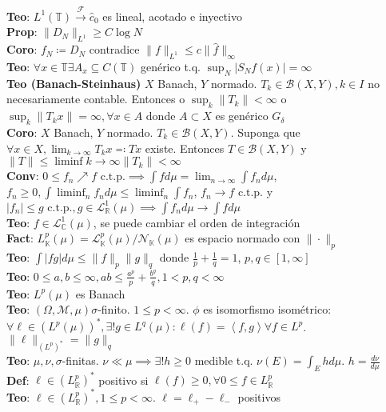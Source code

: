 \documentclass[9pt]{extarticle}
\newcommand{\C}{\mathbb{C}}
\newcommand{\R}{\mathbb{R}}
\newcommand{\K}{\mathbb{K}}
\newcommand{\T}{\mathbb{T}}
\newcommand{\F}{\mathcal{F}}
\newcommand{\inn}[1]{\left\langle #1\right\rangle}
\begin{document}
\begin{multicols*}{2}
\textbf{Teo}: $L^1(\T)\xrightarrow{\F}\hat c_0$ es lineal, acotado e inyectivo\\
\textbf{Prop}: $\|D_N\|_{L^1}\geq C\log N$\\
\textbf{Coro}: $f_N\coloneqq D_N$ contradice $\|f\|_{L^1}\leq c\|\hat f\|_{\infty}$\\
\textbf{Teo}: $\forall x\in\T\exists A_x\subseteq C(\T)$ genérico t.q. $\sup_N|S_N f(x)|=\infty$\\
\textbf{Teo (Banach-Steinhaus)} $X$ Banach, $Y$ normado. $T_k\in\mathcal{B}(X,Y),k\in I$ no necesariamente contable. Entonces o $\sup_{k}\|T_k\|<\infty$ o $\sup_k\|T_kx\|=\infty,\forall x\in A$ donde $A\subset X$ es genérico $G_\delta$\\
\textbf{Coro}: $X$ Banach, $Y$ normado. $T_k\in\mathcal{B}(X,Y)$. Suponga que $\forall x\in X, \lim_{k\to\infty} T_k x\eqqcolon Tx$ existe. Entonces $T\in\mathcal{B}(X,Y)$ y $\|T\|\leq \liminf{k\to\infty} \|T_k\|<\infty$\\
\textbf{Conv}: $0\leq f_n\nearrow f\text{ c.t.p.}\implies \int fd\mu=\lim_{n\to\infty}\int f_nd\mu$, $f_n\geq 0,\int\liminf_n f_nd\mu\leq\liminf_n\int f_n$, $f_n\to f\text{ c.t.p.}$ y $|f_n|\leq g\text{ c.t.p.},g\in \mathcal{L}^1_\R(\mu)\implies \int f_nd\mu\to\int fd\mu$\\
\textbf{Teo}: $f\in\mathcal{L}^1_\C(\mu)$, se puede cambiar el orden de integración\\
\textbf{Fact}: $L^p_\K(\mu)=\mathcal{L}_\K^p(\mu)/\mathcal{N}_\K(\mu)$ es espacio normado con $\|\cdot\|_p$\\
\textbf{Teo}: $\int |fg|d\mu\leq \|f\|_p\|g\|_q$ donde $\frac{1}{p}+\frac{1}{q}=1$, $p,q\in [1,\infty]$\\
\textbf{Teo}: $0\leq a,b\leq \infty, ab\leq \frac{a^p}{p}+\frac{b^q}{q},1<p,q<\infty$\\
\textbf{Teo}: $L^p(\mu)$ es Banach\\
\textbf{Teo}: $(\Omega,\mathcal{M},\mu) \sigma$-finito. $1\leq p<\infty$. $\phi$ es isomorfismo isométrico: $\forall\ell\in (L^p(\mu))^*,\exists!g\in L^q(\mu):\ell(f)=\inn{f,g}\forall f\in L^p$. $\|\ell\|_{(L^p)^*}=\|g\|_q$\\
\textbf{Teo}: $\mu,\nu,\sigma$-finitas. $\nu\ll\mu\implies \exists!h\geq 0$ medible t.q. $\nu(E)=\int_Ehd\mu$. $h=\frac{d\nu}{d\mu}$\\
\textbf{Def}: $\ell\in (L^p_\R)^*$ positivo si $\ell(f)\geq 0,\forall 0\leq f\in L^p_\R$\\
\textbf{Teo}: $\ell\in (L^p_\R)^*,1\leq p<\infty$. $\ell=\ell_+-\ell_{-}$ positivos\\

\end{multicols*}
\end{document}
